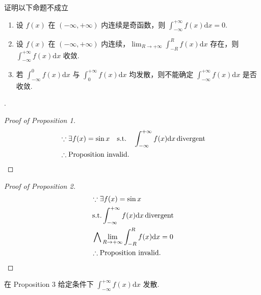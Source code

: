 \begin{example}
    证明以下命题不成立
    \begin{enumerate}
        \item 设 $f(x)$ 在 $(-\infty, +\infty)$ 内连续是奇函数，则 $\int_{-\infty}^{+\infty} f(x) \mathrm dx = 0$.
        \item 设 $f(x)$ 在 $(-\infty, +\infty)$ 内连续，$\lim_{R \to +\infty} \int_{-R}^{R} f(x) \mathrm dx$ 存在，则 $\int_{-\infty}^{+\infty} f(x) \mathrm dx$ 收敛.
        \item 若 $\int_{-\infty}^{0} f(x) \mathrm dx$ 与 $\int_0^{+\infty} f(x) \mathrm dx$ 均发散，则不能确定 $\int_{-\infty}^{+\infty}f(x) \mathrm dx$ 是否收敛.
    \end{enumerate}
    
    \cite[question 204]{w660}.

    \begin{proof}[Proof of Proposition 1]
        \begin{align*}
            &\because   \exists f(x) = \sin x \quad \mbox{s.t.} \quad \int_{-\infty}^{+\infty} f(x) \mathrm dx \mbox{\,divergent}\\
            &\therefore \mbox{Proposition invalid.}
        \end{align*}
    \end{proof}

    \begin{proof}[Proof of Proposition 2]
        \begin{align*}
            &\because   \exists f(x) = \sin x \\
            &{\,}\mbox{s.t.} 
                        \int_{-\infty}^{+\infty} f(x) \mathrm dx 
                        \mbox{\,divergent} \\
            &{\,}\bigwedge 
                        \lim_{R \to +\infty} \int_{-R}^{R} f(x) \mathrm dx = 0 \\
            &\therefore \mbox{Proposition invalid.}
        \end{align*}
    \end{proof}

    在 Proposition 3 给定条件下 $\int_{-\infty}^{+\infty}f(x) \mathrm dx$ 发散.
\end{example}
